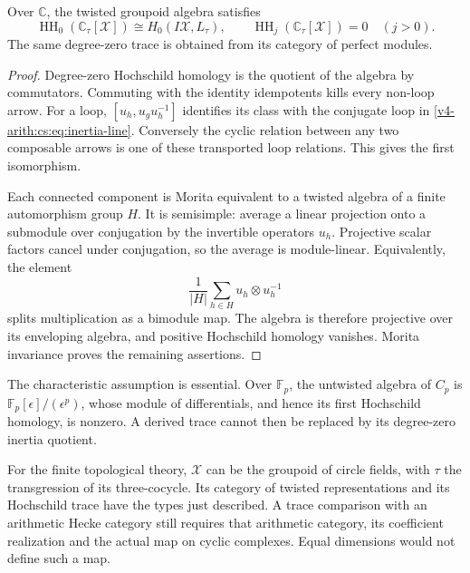 \begin{proposition}
\label{v4-arith:cs:prop:twisted-hh}
Over \(\mathbb C\), the twisted groupoid algebra satisfies
\begin{equation}
 \operatorname{HH}_0(\mathbb C_\tau[\mathcal X])
       \cong H_0(I\mathcal X,L_\tau),
 \qquad
 \operatorname{HH}_j(\mathbb C_\tau[\mathcal X])=0
                  \quad(j>0).
 \label{v4-arith:cs:eq:twisted-hh}
\end{equation}
The same degree-zero trace is obtained from its category of perfect modules.
\end{proposition}

\begin{proof}
Degree-zero Hochschild homology is the quotient of the algebra by
commutators. Commuting with the identity idempotents kills every non-loop
arrow. For a loop, \([u_h,u_gu_h^{-1}]\) identifies its class with the
conjugate loop in \eqref{v4-arith:cs:eq:inertia-line}. Conversely the cyclic
relation between any two composable arrows is one of these transported loop
relations. This gives the first isomorphism.

Each connected component is Morita equivalent to a twisted algebra of a
finite automorphism group \(H\). It is semisimple: average a linear
projection onto a submodule over conjugation by the invertible operators
\(u_h\). Projective scalar factors cancel under conjugation, so the average
is module-linear. Equivalently, the element
\[
 \frac1{|H|}\sum_{h\in H}u_h\otimes u_h^{-1}
\]
splits multiplication as a bimodule map. The algebra is therefore projective
over its enveloping algebra, and positive Hochschild homology vanishes.
Morita invariance proves the remaining assertions.
\end{proof}

The characteristic assumption is essential. Over \(\mathbb F_p\), the
untwisted algebra of \(C_p\) is \(\mathbb F_p[\epsilon]/(\epsilon^p)\),
whose module of differentials, and hence its first Hochschild homology, is
nonzero. A derived trace cannot then be replaced by its degree-zero inertia
quotient.

For the finite topological theory, \(\mathcal X\) can be the groupoid of
circle fields, with \(\tau\) the transgression of its three-cocycle. Its
category of twisted representations and its Hochschild trace have the types
just described. A trace comparison with an arithmetic Hecke category still
requires that arithmetic category, its coefficient realization and the
actual map on cyclic complexes. Equal dimensions would not define such a
map.

